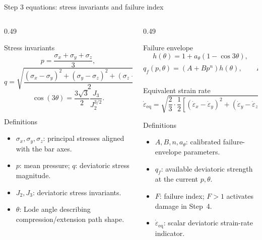 \documentclass[11pt,aspectratio=169]{beamer}
\begin{document}
\begin{frame}{Step 3 equations: stress invariants and failure index}
  \scriptsize
  \begin{columns}[T,onlytextwidth]
    \begin{column}{0.49\textwidth}
      \begin{block}{Stress invariants}
        \[
          p=\frac{\sigma_x+\sigma_y+\sigma_z}{3},
        \]
        \[
          q=\sqrt{\frac{(\sigma_x-\sigma_y)^2+
          (\sigma_y-\sigma_z)^2+(\sigma_z-\sigma_x)^2}{2}} .
        \]
        \[
          \cos(3\theta)=\frac{3\sqrt{3}}{2}\frac{J_3}{J_2^{3/2}} .
        \]
      \end{block}
      \begin{block}{Definitions}
        \begin{itemize}
          \item $\sigma_x,\sigma_y,\sigma_z$: principal stresses aligned with the bar axes.
          \item $p$: mean pressure; $q$: deviatoric stress magnitude.
          \item $J_2,J_3$: deviatoric stress invariants.
          \item $\theta$: Lode angle describing compression/extension path shape.
        \end{itemize}
      \end{block}
    \end{column}
    \begin{column}{0.49\textwidth}
      \begin{exampleblock}{Failure envelope}
        \[
          h(\theta)=1+a_\theta\left(1-\cos3\theta\right),
        \]
        \[
          q_f(p,\theta)=\left(A+Bp^n\right)h(\theta),
          \qquad
          F(t)=\frac{q(t)}{q_f(t)} .
        \]
      \end{exampleblock}
      \begin{block}{Equivalent strain rate}
        \[
          \dot{\varepsilon}_{\mathrm{eq}}=
          \sqrt{\frac{2}{3}\cdot\frac{1}{2}
          \left[
          (\dot{\varepsilon}_x-\dot{\varepsilon}_y)^2+
          (\dot{\varepsilon}_y-\dot{\varepsilon}_z)^2+
          (\dot{\varepsilon}_z-\dot{\varepsilon}_x)^2
          \right]} .
        \]
      \end{block}
      \begin{block}{Definitions}
        \begin{itemize}
          \item $A,B,n,a_\theta$: calibrated failure-envelope parameters.
          \item $q_f$: available deviatoric strength at the current $p,\theta$.
          \item $F$: failure index; $F>1$ activates damage in Step~4.
          \item $\dot{\varepsilon}_{\mathrm{eq}}$: scalar deviatoric strain-rate indicator.
        \end{itemize}
      \end{block}
    \end{column}
  \end{columns}
\end{frame}
\end{document}
